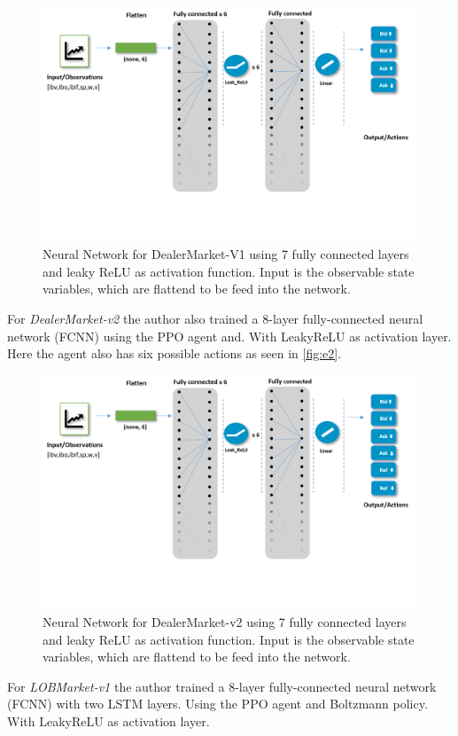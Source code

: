 \documentclass{kththesis}
\theoremstyle{definition}
\begin{document}
\begin{figure}[H]
    \centering
    \includegraphics[scale=.5]{Imgs/nnadmv1.png}
    \caption{Neural Network for DealerMarket-V1 using 7 fully connected layers and leaky ReLU as activation function. Input is the observable state variables, which are flattend to be feed into the network.}
    \label{fig:e1}
\end{figure}
For \textit{DealerMarket-v2} the author also trained a 8-layer fully-connected neural network (FCNN) using the PPO agent and. With LeakyReLU as activation layer. Here the agent also has six possible actions as seen in \autoref{fig:e2}. 

\begin{figure}[H]
    \centering
    \includegraphics[scale=.5]{Imgs/nna1.png}
    \caption{Neural Network for DealerMarket-v2 using 7 fully connected layers and leaky ReLU as activation function. Input is the observable state variables, which are flattend to be feed into the network.}
    \label{fig:e2}
\end{figure}
For \textit{LOBMarket-v1} the author trained a 8-layer fully-connected neural network (FCNN) with two LSTM layers. Using the PPO agent and Boltzmann policy. With LeakyReLU as activation layer.
\end{document}
